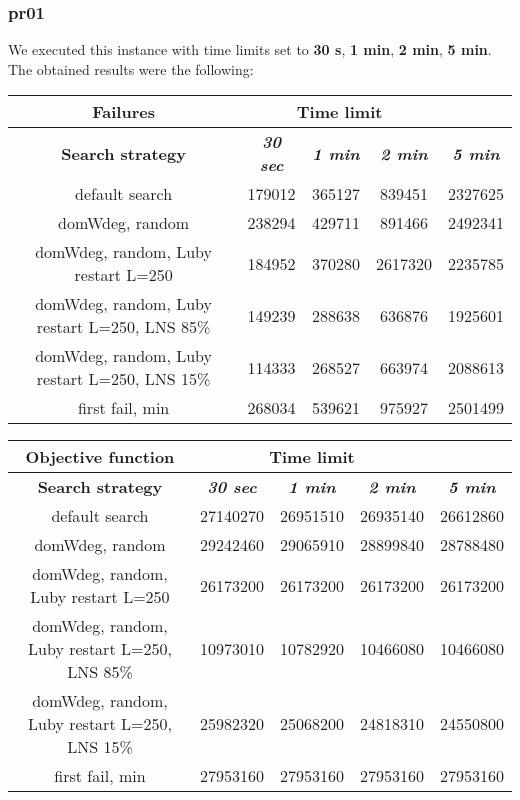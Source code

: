 \subsubsection{pr01}
We executed this instance with time limits set to \textbf{30 s}, \textbf{1 min}, \textbf{2 min}, \textbf{5 min}.\\
The obtained results were the following:
{
\renewcommand{\arraystretch}{2}
\begin{longtable}[h]{| c | c | c | c | c |}
    \hline
    \textbf{Failures} & \multicolumn{3}{c}{Time limit} & \\
    \hline
    \textbf{Search strategy} & \textbf{\textit{30 sec}} & \textbf{\textit{1 min}} & \textbf{\textit{2 min}} & \textbf{\textit{5 min}} \\
    \hline
    \endhead
    default search                                & 179012 & 365127 &  839451 & 2327625 \\
    \hline
    domWdeg, random                               & 238294 & 429711 &  891466 & 2492341 \\
    \hline
    domWdeg, random, Luby restart L=250           & 184952 & 370280 & 2617320 & 2235785 \\
    \hline
    domWdeg, random, Luby restart L=250, LNS 85\% & 149239 & 288638 &  636876 & 1925601 \\
    \hline
    domWdeg, random, Luby restart L=250, LNS 15\% & 114333 & 268527 &  663974 & 2088613 \\
    \hline
    first fail, min                               & 268034 & 539621 &  975927 & 2501499 \\
    \hline
\end{longtable}
}

{
\renewcommand{\arraystretch}{2}
\begin{longtable}[h]{| c | c | c | c | c |}
    \hline
    \textbf{Objective function} & \multicolumn{3}{c}{Time limit} & \\
    \hline
    \textbf{Search strategy} & \textbf{\textit{30 sec}} & \textbf{\textit{1 min}} & \textbf{\textit{2 min}} & \textbf{\textit{5 min}} \\
    \hline
    \endhead
    default search                                & 27140270 & 26951510 & 26935140 & 26612860 \\
    \hline
    domWdeg, random                               & 29242460 & 29065910 & 28899840 & 28788480 \\
    \hline
    domWdeg, random, Luby restart L=250           & 26173200 & 26173200 & 26173200 & 26173200 \\
    \hline
    domWdeg, random, Luby restart L=250, LNS 85\% & 10973010 & 10782920 & 10466080 & 10466080 \\
    \hline
    domWdeg, random, Luby restart L=250, LNS 15\% & 25982320 & 25068200 & 24818310 & 24550800 \\
    \hline
    first fail, min                               & 27953160 & 27953160 & 27953160 & 27953160 \\
    \hline
\end{longtable}
}